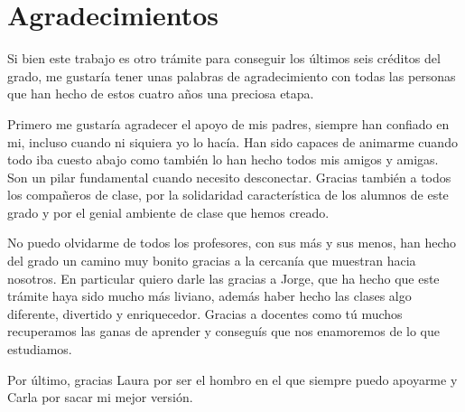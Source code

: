 
\pagestyle{fancy} 

\chapter*{Agradecimientos}

Si bien este trabajo es otro trámite para conseguir los últimos seis créditos del grado, me gustaría tener unas palabras de agradecimiento con 
todas las personas que han hecho de estos cuatro años una preciosa etapa.

Primero me gustaría agradecer el apoyo de mis padres, siempre han confiado en mi, incluso cuando ni siquiera yo lo hacía. Han sido capaces
de animarme cuando todo iba cuesto abajo como también lo han hecho todos mis amigos y amigas. Son un pilar fundamental cuando necesito 
desconectar. Gracias también a todos los compañeros de clase, por la solidaridad característica de los alumnos de este grado y por el genial
ambiente de clase que hemos creado.

No puedo olvidarme de todos los profesores, con sus más y sus menos, han hecho del grado un camino muy bonito gracias a la cercanía que muestran
hacia nosotros. En particular quiero darle las gracias a Jorge, que ha hecho que este trámite haya sido mucho más liviano, además haber hecho
las clases algo diferente, divertido y enriquecedor. Gracias a docentes como tú muchos recuperamos las ganas de aprender y conseguís que nos 
enamoremos de lo que estudiamos.

Por último, gracias Laura por ser el hombro en el que siempre puedo apoyarme y Carla por sacar mi mejor versión. 